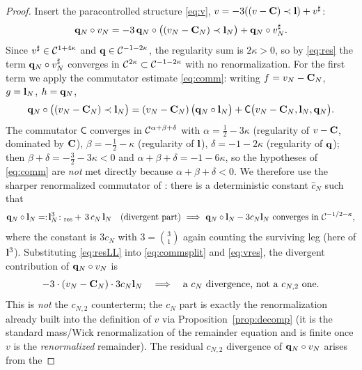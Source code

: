 \begin{proof}
Insert the paracontrolled structure \eqref{eq:v}, $v=-3((v-\mathbf{C})\prec\mathbf{l})+v^\sharp$:
\begin{equation}\label{eq:vres}
\mathbf{q}_N\circ v_N=-3\,\mathbf{q}_N\circ\bigl((v_N-\mathbf{C}_N)\prec\mathbf{l}_N\bigr)+\mathbf{q}_N\circ v_N^\sharp .
\end{equation}
Since $v^\sharp\in\mathcal{C}^{1+4\kappa}$ and $\mathbf{q}\in\mathcal{C}^{-1-2\kappa}$, the regularity
sum is $2\kappa>0$, so by \eqref{eq:res} the term $\mathbf{q}_N\circ v_N^\sharp$
converges in $\mathcal{C}^{2\kappa}\subset\mathcal{C}^{-1-2\kappa}$ with no renormalization. For the
first term we apply the commutator estimate \eqref{eq:comm}: writing
$f=v_N-\mathbf{C}_N$, $g=\mathbf{l}_N$, $h=\mathbf{q}_N$,
\begin{equation}\label{eq:commsplit}
\mathbf{q}_N\circ\bigl((v_N-\mathbf{C}_N)\prec\mathbf{l}_N\bigr)
=(v_N-\mathbf{C}_N)\,\bigl(\mathbf{q}_N\circ\mathbf{l}_N\bigr)+\mathsf C\bigl(v_N-\mathbf{C}_N,\mathbf{l}_N,\mathbf{q}_N\bigr).
\end{equation}
The commutator $\mathsf C$ converges in $\mathcal{C}^{\alpha+\beta+\delta}$ with
$\alpha=\tfrac12-3\kappa$ (regularity of $v-\mathbf{C}$, dominated by $\mathbf{C}$),
$\beta=-\tfrac12-\kappa$ (regularity of $\mathbf{l}$), $\delta=-1-2\kappa$ (regularity
of $\mathbf{q}$); then $\beta+\delta=-\tfrac32-3\kappa<0$ and
$\alpha+\beta+\delta=-1-6\kappa$, so the hypotheses of \eqref{eq:comm} are
\emph{not} met directly because $\alpha+\beta+\delta<0$. We therefore use the
sharper renormalized commutator of \cite{CC18}: there is a deterministic constant
$\widehat c_N$ such that
\begin{equation}\label{eq:resLL}
\qoneLsq_N\circ\qoneLin_N=:\!\qoneLin_N^3\!:\,_{\!\mathrm{res}}+\,3\,c_N\,\qoneLin_N\quad\text{(divergent part)}\ \Longrightarrow\ \qoneLsq_N\circ\qoneLin_N-3c_N\qoneLin_N\ \text{converges in }\qoneC^{-1/2-\kappa},
\end{equation}
where the constant is $3c_N$ with $3=\binom31$ again counting the surviving leg
(here of $\mathbf{l}^3$). Substituting \eqref{eq:resLL} into \eqref{eq:commsplit} and
\eqref{eq:vres}, the divergent contribution of $\mathbf{q}_N\circ v_N$ is
\[
-3\cdot(v_N-\mathbf{C}_N)\cdot 3c_N\mathbf{l}_N\quad\Longrightarrow\quad\text{a $c_N$ divergence, not a $c_{N,2}$ one.}
\]
This is \emph{not} the $c_{N,2}$ counterterm; the $c_N$ part is exactly the
renormalization already built into the definition of $v$ via
Proposition~\ref{prop:decomp} (it is the standard mass/Wick renormalization of the
remainder equation and is finite once $v$ is the \emph{renormalized} remainder).
The residual $c_{N,2}$ divergence of $\mathbf{q}_N\circ v_N$ arises from the

\end{proof}

